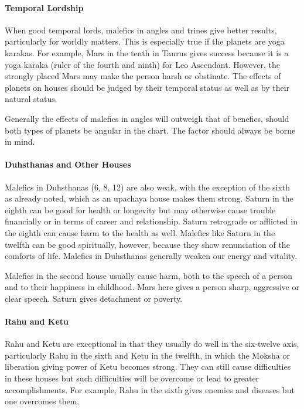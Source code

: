  

\paragraph{Temporal Lordship}

When good temporal lords, malefics in angles and trines give better results, particularly for worldly matters. This is especially true if the planets are yoga karakas. For example, Mars in the tenth in Taurus gives success because it is a yoga karaka (ruler of the fourth and ninth) for Leo Ascendant. However, the strongly placed Mars may make the person harsh or obstinate. The effects of planets on houses should be judged by their temporal status as well as by their natural status.

 

Generally the effects of malefics in angles will outweigh that of benefics, should both types of planets be angular in the chart. The factor should always be borne in mind.

 

\paragraph{Duhsthanas and Other Houses}

Malefics in Duhsthanas (6, 8, 12) are also weak, with the exception of the sixth as already noted, which as an upachaya house makes them strong. Saturn in the eighth can be good for health or longevity but may otherwise cause trouble financially or in terms of career and relationship. Saturn retrograde or afflicted in the eighth can cause harm to the health as well. Malefics like Saturn in the twelfth can be good spiritually, however, because they show renunciation of the comforts of life. Malefics in Duhsthanas generally weaken our energy and vitality.

 

Malefics in the second house usually cause harm, both to the speech of a person and to their happiness in childhood. Mars here gives a person sharp, aggressive or clear speech. Saturn gives detachment or poverty.

 

\paragraph{Rahu and Ketu}

Rahu and Ketu are exceptional in that they usually do well in the six-twelve axis, particularly Rahu in the sixth and Ketu in the twelfth, in which the Moksha or liberation giving power of Ketu becomes strong. They can still cause difficulties in these houses but such difficulties will be overcome or lead to greater accomplishments. For example, Rahu in the sixth gives enemies and diseases but one overcomes them.

